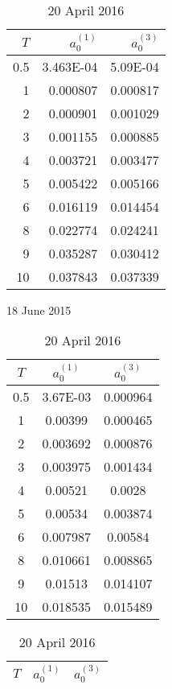 \documentclass[12pt,a4paper]{article}
\theoremstyle{plain}
\numberwithin{equation}{section}
\begin{document}
\begin{table}[t]
\begin{subtable}{.4\textwidth}
\centering
    \begin{tabular}{|rrr|}
     \hline
    $T$ &$a_0^{(1)}$ & $a_0^{(3)}$ \\
   \hline
    0.5   & 3.463E-04  & 5.09E-04   \\
    1     & 0.000807 & 0.000817 \\
    2     & 0.000901 & 0.001029 \\
    3     & 0.001155 & 0.000885 \\
    4     & 0.003721 & 0.003477 \\
    5     & 0.005422 & 0.005166\\
    6     & 0.016119 & 0.014454 \\
    8     & 0.022774 & 0.024241 \\
    9     & 0.035287 & 0.030412 \\
    10    & 0.037843 & 0.037339 \\
     \hline
    \end{tabular}
\caption{18 June 2015}
\end{subtable}
\begin{subtable}{.4\textwidth}
\centering
     \begin{tabular}{|ccc|}
    \hline
    $T$ &$a_0^{(1)}$ & $a_0^{(3)}$ \\
    \hline
    0.5   & 3.67E-03  & 0.000964 \\
    1     & 0.00399 & 0.000465 \\
    2     & 0.003692 & 0.000876 \\
    3     & 0.003975 & 0.001434 \\
    4     & 0.00521 & 0.0028 \\
    5     & 0.00534 & 0.003874 \\
    6     & 0.007987 & 0.00584 \\
    8     & 0.010661 & 0.008865 \\
    9     & 0.01513 & 0.014107 \\
    10    & 0.018535 & 0.015489 \\
     \hline
    \end{tabular}%
\caption{20 April 2016}
\end{subtable}\vspace*{1.5em}

\begin{subtable}{.4\textwidth}
\centering
    \begin{tabular}{|rrr|}
     \hline
    $T$ &$a_0^{(1)}$ & $a_0^{(3)}$ \\
   \hline


\end{tabular}
\end{subtable}
\end{table}
\end{document}
